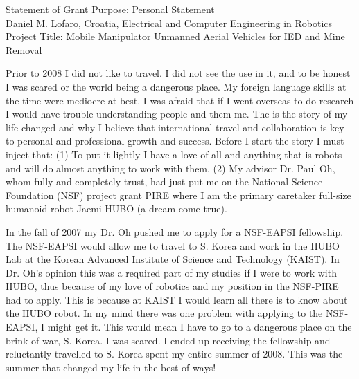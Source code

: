 \documentclass[12pt]{article}
\begin{document}
\begin{center}
Statement of Grant Purpose: Personal Statement\\
Daniel M. Lofaro, Croatia, Electrical and Computer Engineering in Robotics\\
Project Title: Mobile Manipulator Unmanned Aerial Vehicles for IED and Mine Removal\\

\end{center}

\normalsize
Prior to 2008 I did not like to travel. 
I did not see the use in it, and to be honest I was scared or the world being a dangerous place.  
My foreign language skills at the time were mediocre at best.  
I was afraid that if I went overseas to do research I would have trouble understanding people and them me.  
The is the story of my life changed and why I believe that international travel and collaboration is key to personal and professional growth and success.
Before I start the story I must inject that: 
(1) To put it lightly I have a love of all and anything that is robots and will do almost anything to work with them.  
(2) My advisor Dr. Paul Oh, whom fully and completely trust, had just put me on the National Science Foundation (NSF) project grant PIRE where I am the primary caretaker full-size humanoid robot Jaemi HUBO (a dream come true).  

In the fall of 2007 my Dr. Oh pushed me to apply for a NSF-EAPSI fellowship.  
The NSF-EAPSI would allow me to travel to S. Korea and work in the HUBO Lab at the Korean Advanced Institute of Science and Technology (KAIST).  
In Dr. Oh's opinion this was a required part of my studies if I were to work with HUBO, thus because of my love of robotics and my position in the NSF-PIRE had to apply.
This is because at KAIST I would learn all there is to know about the HUBO robot.
In my mind there was one problem with applying to the NSF-EAPSI, I might get it.
This would mean I have to go to a dangerous place on the brink of war, S. Korea.
I was scared.  
I ended up receiving the fellowship and reluctantly travelled to S. Korea spent my entire summer of 2008.  
This was the summer that changed my life in the best of ways!  

\end{document}
